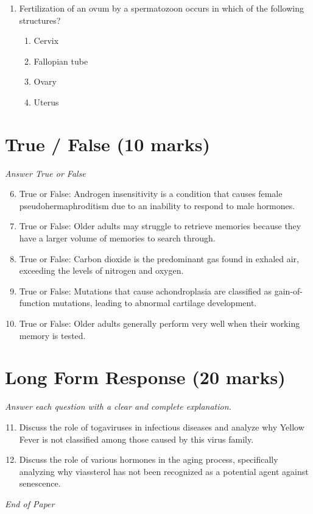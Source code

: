 \documentclass[12pt]{article}
\begin{document}
\begin{enumerate}[label=\arabic*.]
\begin{enumerate}[label=(\alph*)]
    \item is a measure of the level of heterozygotes in a population
    \item is a measure of the proportion of variation that is due to genetic causes
    \item is a measure of proportion of repeated DNA in an organism
    \item is a measure of level of gene linkage
\end{enumerate}
\item Fertilization of an ovum by a spermatozoon occurs in which of the following structures?
\begin{enumerate}[label=(\alph*)]
    \item Cervix
    \item Fallopian tube
    \item Ovary
    \item Uterus
\end{enumerate}
\end{enumerate}

\section*{True / False (10 marks)}
\textit{Answer True or False}
\begin{enumerate}[label=\arabic*.]
\setcounter{enumi}{5}
\item True or False: Androgen insensitivity is a condition that causes female pseudohermaphroditism due to an inability to respond to male hormones.
\item True or False: Older adults may struggle to retrieve memories because they have a larger volume of memories to search through.
\item True or False: Carbon dioxide is the predominant gas found in exhaled air, exceeding the levels of nitrogen and oxygen.
\item True or False: Mutations that cause achondroplasia are classified as gain-of-function mutations, leading to abnormal cartilage development.
\item True or False: Older adults generally perform very well when their working memory is tested.
\end{enumerate}

\section*{Long Form Response (20 marks)}
\textit{Answer each question with a clear and complete explanation.}
\begin{enumerate}[label=\arabic*.]
\setcounter{enumi}{10}
\item Discuss the role of togaviruses in infectious diseases and analyze why Yellow Fever is not classified among those caused by this virus family.
\item Discuss the role of various hormones in the aging process, specifically analyzing why viassterol has not been recognized as a potential agent against senescence.
\end{enumerate}

\vfill
\noindent\textit{End of Paper}
\end{document}

